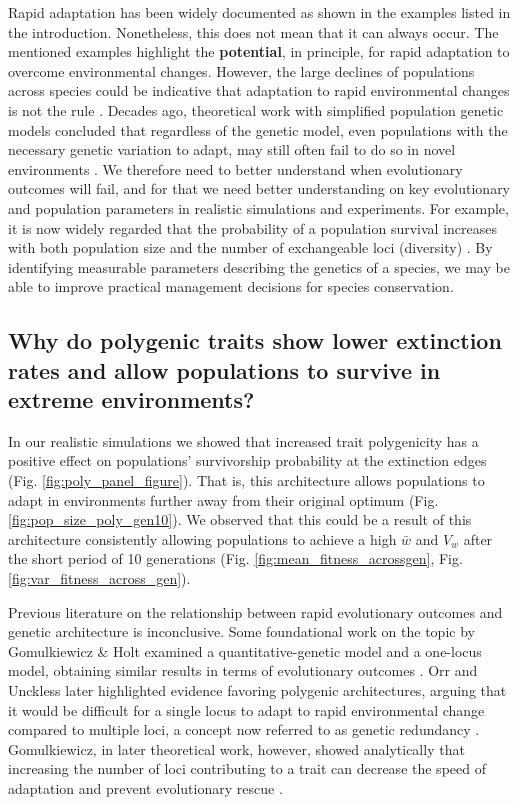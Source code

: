 \documentclass{article}
\begin{document}
Rapid adaptation has been widely documented as shown in the examples listed in the introduction. Nonetheless, this does not mean that it can always occur. The mentioned examples highlight the \textbf{potential}, in principle, for rapid adaptation to overcome environmental changes. However,  the large declines of populations across species could be indicative that adaptation to rapid environmental changes is not the rule \citep{ias_ipbes_2023}. Decades ago, theoretical work with simplified population genetic models concluded that regardless of the genetic model, even populations with the necessary genetic variation to adapt, may still often fail to do so in novel environments  \citep{Gomulkiewicz1995-sj}. We therefore need to better understand when evolutionary outcomes will fail, and for that we need better understanding on key evolutionary and population parameters in realistic simulations and experiments. For example, it is now widely regarded that the  probability  of  a population  survival  increases  with  both  population  size  and  the number of exchangeable loci (diversity) \citep{Newman1997-tx, Markert2010-wc, Nabutanyi2022-jb}. By identifying measurable parameters describing the genetics of a species, we may be able to improve practical management decisions for species conservation. 

\subsection{Why do polygenic traits show lower extinction rates and allow populations to survive in extreme environments?}
In our realistic simulations we showed that increased trait polygenicity has a positive effect on populations' survivorship probability at the extinction edges (Fig. \ref{fig:poly_panel_figure}). That is, this architecture allows populations to adapt in environments further away from their original optimum (Fig. \ref{fig:pop_size_poly_gen10}). We observed that this could be a result of this architecture consistently allowing populations to achieve a high $\bar{w}$ and $V_w$ after the short period of 10 generations (Fig. \ref{fig:mean_fitness_acrossgen},  Fig. \ref{fig:var_fitness_across_gen}).

Previous literature on the relationship between rapid evolutionary outcomes and genetic architecture is inconclusive. Some foundational work on the topic by Gomulkiewicz \& Holt examined a quantitative-genetic model and a one-locus model, obtaining similar results in terms of evolutionary outcomes \citep{Gomulkiewicz1995-sj}. Orr and Unckless later highlighted evidence favoring polygenic architectures, arguing that it would be difficult for a single locus to adapt to rapid environmental change compared to multiple loci, a concept now referred to as genetic redundancy \citep{Laruson2020-kd}. Gomulkiewicz, in later theoretical work, however, showed analytically that increasing the number of loci contributing to a trait can decrease the speed of adaptation and prevent evolutionary rescue \citep{Gomulkiewicz2010-wr}.
\end{document}
